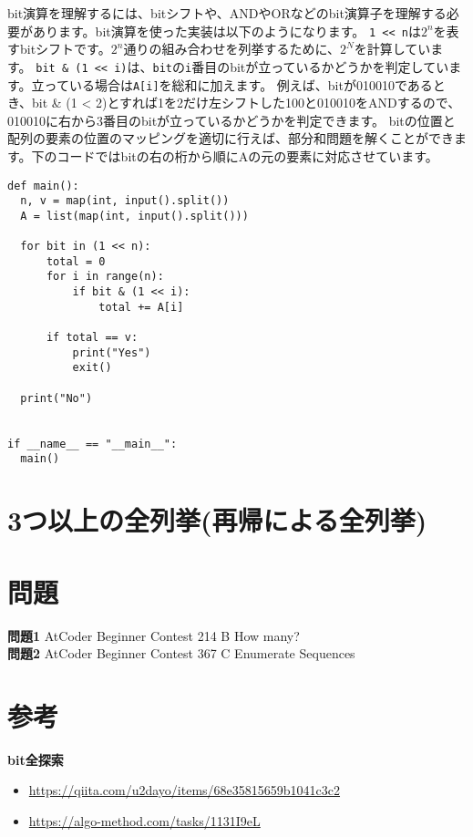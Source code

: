 bit演算を理解するには、bitシフトや、ANDやORなどのbit演算子を理解する必要があります。bit演算を使った実装は以下のようになります。
\texttt{1 << n}は$2^n$を表すbitシフトです。$2^n$通りの組み合わせを列挙するために、$2^N$を計算しています。
\texttt{bit \& (1 << i)}は、\texttt{bit}の\texttt{i}番目のbitが立っているかどうかを判定しています。立っている場合は\texttt{A[i]}を総和に加えます。
例えば、bitが010010であるとき、bit \& (1 < 2)とすれば1を2だけ左シフトした100と010010をANDするので、010010に右から3番目のbitが立っているかどうかを判定できます。
bitの位置と配列の要素の位置のマッピングを適切に行えば、部分和問題を解くことができます。下のコードではbitの右の桁から順にAの元の要素に対応させています。

\begin{lstlisting}[caption=bit演算を使ったbit全探索, label=bit_search, frame=TRBL]
def main():
  n, v = map(int, input().split())
  A = list(map(int, input().split()))
  
  for bit in (1 << n):
      total = 0
      for i in range(n):
          if bit & (1 << i):
              total += A[i]
      
      if total == v:
          print("Yes")
          exit()
  
  print("No")
              

if __name__ == "__main__":
  main()
\end{lstlisting}

\section{3つ以上の全列挙(再帰による全列挙)}

\section{問題}

\textbf{問題1} AtCoder Beginner Contest 214 B How many?\\
\textbf{問題2}  AtCoder Beginner Contest 367 C Enumerate Sequences \\


\section{参考}
\textbf{bit全探索}
\begin{itemize}
	\item \url{https://qiita.com/u2dayo/items/68e35815659b1041c3c2}
	\item \url{https://algo-method.com/tasks/1131I9eL}
\end{itemize}

